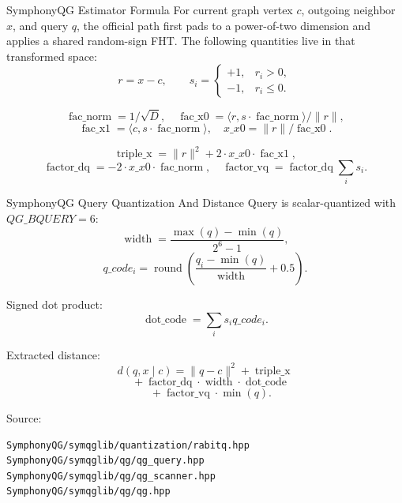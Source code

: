 \documentclass[aspectratio=169,10pt]{beamer}
\begin{document}
\begin{frame}[fragile]{SymphonyQG Estimator Formula}
\small
For current graph vertex \(c\), outgoing neighbor \(x\), and query \(q\), the
official path first pads to a power-of-two dimension and applies a shared
random-sign FHT. The following quantities live in that transformed space:
\[
r=x-c,\qquad s_i=
\begin{cases}
+1,& r_i>0,\\
-1,& r_i\le 0.
\end{cases}
\]

\[
\operatorname{fac\_norm}=1/\sqrt{D},
\quad
\operatorname{fac\_x0}=\langle r,s\cdot\operatorname{fac\_norm}\rangle/\|r\|,
\]
\[
\operatorname{fac\_x1}=\langle c,s\cdot\operatorname{fac\_norm}\rangle,
\quad
x\_x0=\|r\|/\operatorname{fac\_x0}.
\]

\[
\operatorname{triple\_x}=\|r\|^2+2\cdot x\_x0\cdot\operatorname{fac\_x1},
\]
\[
\operatorname{factor\_dq}=-2\cdot x\_x0\cdot\operatorname{fac\_norm},
\quad
\operatorname{factor\_vq}=\operatorname{factor\_dq}\sum_i s_i.
\]
\end{frame}

\begin{frame}[fragile]{SymphonyQG Query Quantization And Distance}
\small
Query is scalar-quantized with \(QG\_BQUERY=6\):
\[
\operatorname{width}=\frac{\max(q)-\min(q)}{2^6-1},
\]
\[
q\_code_i=\operatorname{round}\left(\frac{q_i-\min(q)}{\operatorname{width}}+0.5\right).
\]

Signed dot product:
\[
\operatorname{dot\_code}=\sum_i s_i q\_code_i.
\]

Extracted distance:
\[
d(q,x\mid c)=\|q-c\|^2+\operatorname{triple\_x}
\]
\[
\quad+\operatorname{factor\_dq}\cdot\operatorname{width}\cdot\operatorname{dot\_code}
\]
\[
\quad+\operatorname{factor\_vq}\cdot\min(q).
\]

Source:
\begin{lstlisting}
SymphonyQG/symqglib/quantization/rabitq.hpp
SymphonyQG/symqglib/qg/qg_query.hpp
SymphonyQG/symqglib/qg/qg_scanner.hpp
SymphonyQG/symqglib/qg/qg.hpp
\end{lstlisting}
\end{frame}
\end{document}
